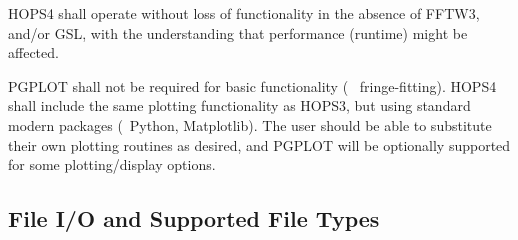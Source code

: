 \begin{description}

 HOPS4 shall operate without loss of functionality in the absence of
FFTW3, and/or GSL, with the understanding that performance (runtime) might be
affected.

 \acs{PGPLOT} shall not be required for basic functionality (\eg~
fringe-fitting). HOPS4 shall include the same plotting functionality as HOPS3,
but using standard modern packages (\eg~Python, Matplotlib). The user should
be able to substitute their own plotting routines as desired, and \acs{PGPLOT}
will be optionally supported for some plotting/display options.

\end{description}





\subsection{File I/O and Supported File Types}
\label{sec:ioreq}

